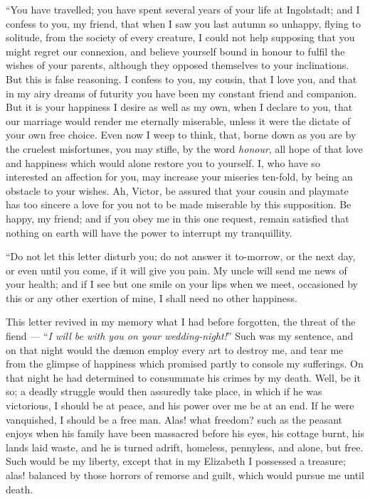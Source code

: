 ``You have travelled; you have
spent several years of your life at Ingolstadt;
and I confess to you, my
friend, that when I saw you last autumn
so unhappy, flying to solitude,
from the society of every creature, I
could not help supposing that you
might regret our connexion, and believe
yourself bound in honour to fulfil
the wishes of your parents, although
they opposed themselves to your inclinations.
But this is false reasoning.
I confess to you, my cousin, that I love
you, and that in my airy dreams of
futurity you have been my constant
friend and companion. But it is your
happiness I desire as well as my own,
when I declare to you, that our marriage
would render me eternally miserable,
unless it were the dictate of your own
free choice. Even now I weep to think,
that, borne down as you are by the
cruelest misfortunes, you may stifle, by
the word \emph{honour}, all hope of that love
and happiness which would alone restore
you to yourself. I, who have so
interested an affection for you, may increase
your miseries ten-fold, by being
an obstacle to your wishes. Ah, Victor,
be assured that your cousin and
playmate has too sincere a love for you
not to be made miserable by this supposition.
Be happy, my friend; and if
you obey me in this one request, remain
satisfied that nothing on earth will
have the power to interrupt my tranquillity.

``Do not let this letter disturb you;
do not answer it to-morrow, or the
next day, or even until you come, if it
will give you pain. My uncle will send
me news of your health; and if I see
but one smile on your lips when we
meet, occasioned by this or any other
exertion of mine, I shall need no other
happiness.



This letter revived in my memory
what I had before forgotten, the threat
of the fiend --- ``\emph{I will be with you on
your wedding-night!}'' Such was my
sentence, and on that night would the
dæmon employ every art to destroy me,
and tear me from the glimpse of happiness
which promised partly to console
my sufferings. On that night he had
determined to consummate his crimes
by my death. Well, be it so; a deadly
struggle would then assuredly take
place, in which if he was victorious, I
should be at peace, and his power over
me be at an end. If he were vanquished,
I should be a free man. Alas!
what freedom? such as the peasant
enjoys when his family have been massacred
before his eyes, his cottage
burnt, his lands laid waste, and he is
turned adrift, homeless, pennyless, and
alone, but free. Such would be my
liberty, except that in my Elizabeth I
possessed a treasure; alas! balanced
by those horrors of remorse and guilt,
which would pursue me until death.


